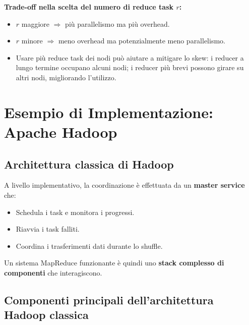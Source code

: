 \textbf{Trade-off nella scelta del numero di reduce task $r$:}
\begin{itemize}
  \item $r$ maggiore $\Rightarrow$ più parallelismo ma più overhead.
  \item $r$ minore $\Rightarrow$ meno overhead ma potenzialmente meno
    parallelismo.
  \item Usare più reduce task dei nodi può aiutare a mitigare lo skew:
    i reducer a lungo termine occupano alcuni nodi; i reducer più brevi
    possono girare su altri nodi, migliorando l'utilizzo.
\end{itemize}

\newpage
\section{Esempio di Implementazione: Apache Hadoop}

\subsection{Architettura classica di Hadoop}

A livello implementativo, la coordinazione è effettuata da un
\textbf{master service} che:
\begin{itemize}
  \item Schedula i task e monitora i progressi.
  \item Riavvia i task falliti.
  \item Coordina i trasferimenti dati durante lo shuffle.
\end{itemize}

Un sistema MapReduce funzionante è quindi uno \textbf{stack complesso di
componenti} che interagiscono.

\subsection{Componenti principali dell'architettura Hadoop classica}

